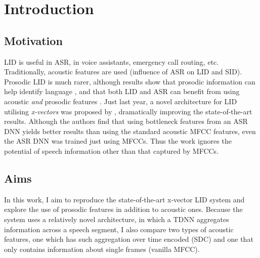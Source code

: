 \documentclass[bsc,frontabs,twoside,singlespacing,parskip,deptreport]{infthesis}
\begin{document}
\chapter{Introduction}{
  \label{chap:Introduction}
  \section{Motivation}{
    LID is useful in ASR, in voice assistants, emergency call routing, etc.
    Traditionally, acoustic features are used (influence of ASR on LID and SID). Prosodic LID is much rarer, although results show that prosodic information can help identify language \citep{Lin_et_al_2005}, and that both LID and ASR can benefit from using acoustic \textit{and} prosodic features \citep{Martinez_et_al_2013,Ghahremani_et_al_2014}.
    Just last year, a novel architecture for LID utilising \textit{x-vectors} was proposed by \cite{Snyder_et_al_2018}, dramatically improving the state-of-the-art results. Although the authors find that using bottleneck features from an ASR DNN yields better results than using the standard acoustic MFCC features, even the ASR DNN was trained just using MFCCs. Thus the work ignores the potential of speech information other than that captured by MFCCs.
  }
  \section{Aims}{
    In this work, I aim to reproduce the state-of-the-art x-vector LID system and explore the use of prosodic features in addition to acoustic ones. Because the system uses a relatively novel architecture, in which a TDNN aggregates information across a speech segment, I also compare two types of acoustic features, one which has such aggregation over time encoded (SDC) and one that only contains information about single frames (vanilla MFCC).
  }
}
\end{document}
